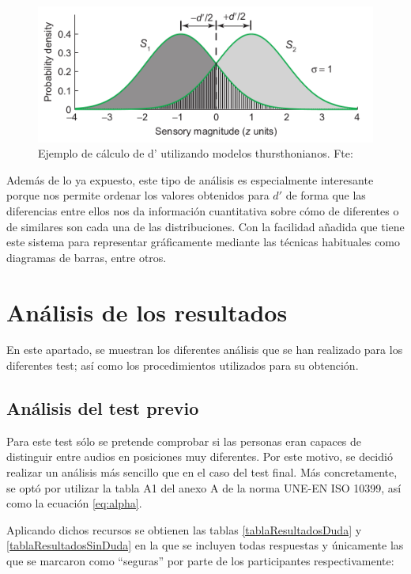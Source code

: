 \documentclass[11pt,a4paper,twoside]{book}
\begin{document}
            \begin{figure}
                \includegraphics[scale=0.7]{../imagenes/modelosthurst.png}
			    \centering
			    \caption{Ejemplo de cálculo de d' utilizando modelos thursthonianos. Fte: \cite{PsychophysicsB} }
			    \label{fig:modelost}
            \end{figure}
            
            Además de lo ya expuesto, este tipo de análisis es especialmente interesante porque nos permite ordenar los valores obtenidos para $d'$ de forma que las diferencias entre ellos nos da información cuantitativa sobre cómo de diferentes o de similares son cada una de las distribuciones. Con la facilidad añadida que tiene este sistema para representar gráficamente mediante las técnicas habituales como diagramas de barras, entre otros.
            
    \section{Análisis de los resultados}
        En este apartado, se muestran los diferentes análisis que se han realizado para los diferentes test; así como los procedimientos utilizados para su obtención.
        
        \subsection{Análisis del test previo}
            Para este test sólo se pretende comprobar si las personas eran capaces de distinguir entre audios en posiciones muy diferentes. Por este motivo, se decidió realizar un análisis más sencillo que en el caso del test final. Más concretamente, se optó por utilizar la tabla A1 del anexo A de la norma UNE-EN ISO 10399, así como la ecuación \ref{eq:alpha}.
            
            Aplicando dichos recursos se obtienen las tablas \ref{tablaResultadosDuda} y \ref{tablaResultadosSinDuda} en la que se incluyen todas respuestas y únicamente las que se marcaron como ``seguras'' por parte de los participantes respectivamente:
            
\end{document}
